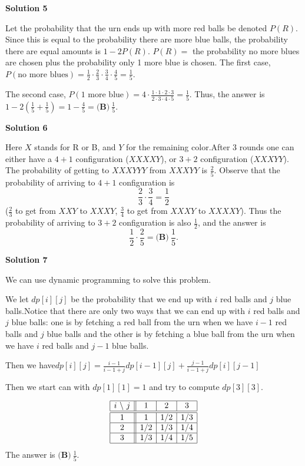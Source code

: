 \begin{enumerate}
\textbf{Solution 5}

Let the probability that the urn ends up with more red balls be denoted $P(R)$. Since this is equal to the probability there are more blue balls, the probability there are equal amounts is $1-2P(R)$. $P(R) =$ the probability no more blues are chosen plus the probability only 1 more blue is chosen. The first case, $P(\text{no more blues}) = \frac{1}{2}\cdot\frac{2}{3}\cdot\frac{3}{4}\cdot\frac{4}{5}=\frac{1}{5}$.

 The second case, $P(\text{1 more blue}) = 4\cdot\frac{1\cdot1\cdot2\cdot3}{2\cdot3\cdot4\cdot5} = \frac{1}{5}$. Thus, the answer is $1-2\left(\frac{1}{5}+\frac{1}{5}\right)=1-\frac{4}{5}=\boxed{\textbf{(B)}\ \frac{1}{5}}$.

 



\textbf{Solution 6}

Here $X$ stands for R or B, and $Y$ for the remaining color.After 3 rounds one can either have a $4+1$ configuration ($XXXXY$), or $3+2$ configuration ($XXXYY$). The probability of getting to $XXXYYY$ from $XXXYY$ is  $\frac{2}{5}$. Observe that the probability of arriving to $4+1$ configuration is  
 \[\frac{2}{3} \cdot \frac{3}{4} = \frac{1}{2}\] ($\frac{2}{3}$ to get from $XXY$ to $XXXY$, $\frac{3}{4}$ to get from $XXXY$ to $XXXXY$). Thus the probability of arriving to $3+2$ configuration is also $\frac{1}{2}$, and the answer is 
 \[\frac{1}{2} \cdot \frac{2}{5} = \boxed{\textbf{(B)}\ \frac{1}{5}}.\]




\textbf{Solution 7}

We can use dynamic programming to solve this problem.

 We let $dp[i][j]$ be the probability that we end up with $i$ red balls and $j$ blue balls.Notice that there are only two ways that we can end up with $i$ red balls and $j$ blue balls: one is by fetching a red ball from the urn when we have $i - 1$ red balls and $j$ blue balls and the other is by fetching a blue ball from the urn when we have $i$ red balls and $j - 1$ blue balls.

 Then we have$dp[i][j] = \frac{i - 1}{i - 1 + j} dp[i - 1][j] + \frac{j - 1}{i - 1 + j} dp[i][j - 1]$

 Then we start can with $dp[1][1] = 1$ and try to compute $dp[3][3]$.

 
 \[\begin{array}{|c || c | c | c | c | c |} \hline i \text{\ \textbackslash\ } j & 1 & 2 & 3\\ \hline\hline 1 & 1 & 1/2 & 1/3\\ \hline 2 & 1/2 & 1/3 & 1/4\\ \hline 3 & 1/3 & 1/4 & 1/5\\ \hline \end{array}\]The answer is $\boxed{\textbf{(B)}\ \frac{1}{5}}$.


\end{enumerate}
